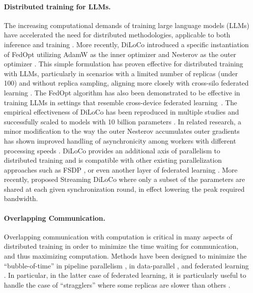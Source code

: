 \paragraph{Distributed training for LLMs.} The increasing computational demands of training large language models (LLMs) have accelerated the need for distributed methodologies, applicable to both inference \citep{borzunov2023petals} and training \citep{presser2020stub,diskin2021distributedcollab,ryabinin2021moshpit}. More recently, DiLoCo \citep{douillard2023diloco} introduced a specific instantiation of FedOpt \citep{reddi2021adaptive} utilizing AdamW \citep{loshchilov2018adamw} as the inner optimizer and Nesterov \citep{sutskever2013nesterov} as the outer optimizer \citep{huo2020outernesterov}. This simple formulation has proven effective for distributed training with LLMs, particularly in scenarios with a limited number of replicas (under 100) and without replica sampling, aligning more closely with cross-silo federated learning \citep{kairouz2021advances}. The FedOpt algorithm has also been demonstrated to be effective in training LLMs in settings that resemble cross-device federated learning~\citep{charles2024towards}. The empirical effectiveness of DiLoCo has been reproduced in multiple studies \citep{jaghouar2024opendiloco,sani2024futurelargelanguagemodel} and successfully scaled to models with 10 billion parameters \citep{jaghouar2024intellect1}.  In related research, a minor modification to the way the outer Nesterov accumulates outer gradients has shown improved handling of asynchronicity among workers with different processing speeds \citep{liu2024asyncdiloco}.  DiLoCo provides an additional axis of parallelism to distributed training \citep{shoeybi2020megatronlmtrainingmultibillionparameter} and is compatible \citep{jaghouar2024intellect1} with other existing parallelization approaches such as FSDP \citep{zhao2023fsdp}, or even another layer of federated learning \citep{sani2024photonfederatedllmpretraining}. More recently, \cite{douillard2025streamingdiloco} proposed Streaming DiLoCo where only a subset of the parameters are shared at each given synchronization round, in effect lowering the peak required bandwidth.

\paragraph{Overlapping Communication.} Overlapping communication with computation is critical in many aspects of distributed training in order to minimize the time waiting for communication, and thus maximizing computation. Methods have been designed to minimize the ``bubble-of-time'' in pipeline parallelism \citep{narayanan2021pipedream2bw,qi2023zerobubblepipelineparallelism}, in data-parallel \citep{zhao2013butterfly,lin2020deepgradientcompressionreducing}, and federated learning \citep{xie2019asynchronous,liu2024asyncdiloco}. In particular, in the latter case of federated learning, it is particularly useful to handle the case of ``stragglers'' where some replicas are slower than others \citep{koh2006parallel, recht2011hogwild, dean2012large, lian2015asynchronous, diskin2021distributedcollab}.


